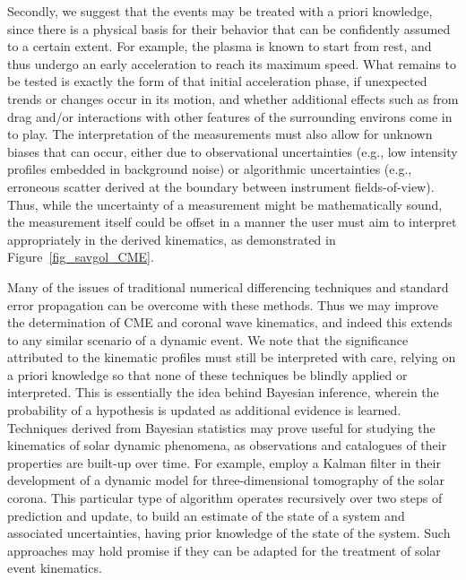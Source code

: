 \documentclass[structabstract]{aa}
\begin{document}
Secondly, we suggest that the events may be treated with a priori knowledge, since there is a physical basis for their behavior that can be confidently assumed to a certain extent. For example, the plasma is known to start from rest, and thus undergo an early acceleration to reach its maximum speed. What remains to be tested is exactly the form of that initial acceleration phase, if unexpected trends or changes occur in its motion, and whether additional effects such as from drag and/or interactions with other features of the surrounding environs come in to play. The interpretation of the measurements must also allow for unknown biases that can occur, either due to observational uncertainties (e.g., low intensity profiles embedded in background noise) or algorithmic uncertainties (e.g., erroneous scatter derived at the boundary between instrument fields-of-view). Thus, while the uncertainty of a measurement might be mathematically sound, the measurement itself could be offset in a manner the user must aim to interpret appropriately in the derived kinematics, as demonstrated in Figure~\ref{fig_savgol_CME}.

Many of the issues of traditional numerical differencing techniques and standard error propagation can be overcome with these methods. Thus we may improve the determination of CME and coronal wave kinematics, and indeed this extends to any similar scenario of a dynamic event. We note that the significance attributed to the kinematic profiles must still be interpreted with care, relying on a priori knowledge so that none of these techniques be blindly applied or interpreted. This is essentially the idea behind Bayesian inference, wherein the probability of a hypothesis is updated as additional evidence is learned. Techniques derived from Bayesian statistics may prove useful for studying the kinematics of solar dynamic phenomena, as observations and catalogues of their properties are built-up over time. For example, \citet{2010SoPh..262..495B} employ a Kalman filter in their development of a dynamic model for three-dimensional tomography of the solar corona. This particular type of algorithm operates recursively over two steps of prediction and update, to build an estimate of the state of a system and associated uncertainties, having prior knowledge of the state of the system. Such approaches may hold promise if they can be adapted for the treatment of solar event kinematics.
\end{document}
